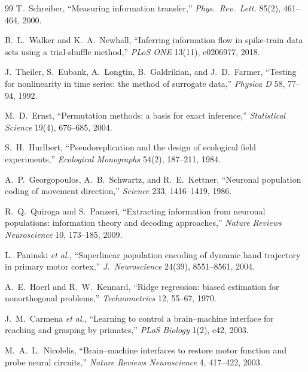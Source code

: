 \documentclass[10pt,a4paper]{article}
\begin{document}
\begin{thebibliography}{99}
T.~Schreiber, ``Measuring information transfer,''
\emph{Phys.\ Rev.\ Lett.} 85(2), 461--464, 2000.

B.~L.~Walker and K.~A.~Newhall, ``Inferring information flow in
spike-train data sets using a trial-shuffle method,'' \emph{PLoS
ONE} 13(11), e0206977, 2018.

J.~Theiler, S.~Eubank, A.~Longtin, B.~Galdrikian, and J.~D.~Farmer,
``Testing for nonlinearity in time series: the method of surrogate
data,'' \emph{Physica D} 58, 77--94, 1992.

M.~D.~Ernst, ``Permutation methods: a basis for exact inference,''
\emph{Statistical Science} 19(4), 676--685, 2004.

S.~H.~Hurlbert, ``Pseudoreplication and the design of ecological
field experiments,'' \emph{Ecological Monographs} 54(2), 187--211,
1984.

A.~P.~Georgopoulos, A.~B.~Schwartz, and R.~E.~Kettner, ``Neuronal
population coding of movement direction,'' \emph{Science} 233,
1416--1419, 1986.

R.~Q.~Quiroga and S.~Panzeri, ``Extracting information from
neuronal populations: information theory and decoding approaches,''
\emph{Nature Reviews Neuroscience} 10, 173--185, 2009.

L.~Paninski \emph{et al.}, ``Superlinear population encoding of
dynamic hand trajectory in primary motor cortex,''
\emph{J.\ Neuroscience} 24(39), 8551--8561, 2004.

A.~E.~Hoerl and R.~W.~Kennard, ``Ridge regression: biased
estimation for nonorthogonal problems,'' \emph{Technometrics} 12,
55--67, 1970.

J.~M.~Carmena \emph{et al.}, ``Learning to control a brain--machine
interface for reaching and grasping by primates,''
\emph{PLoS Biology} 1(2), e42, 2003.

M.~A.~L.~Nicolelis, ``Brain--machine interfaces to restore motor
function and probe neural circuits,'' \emph{Nature Reviews
Neuroscience} 4, 417--422, 2003.

\end{thebibliography}
\end{document}
